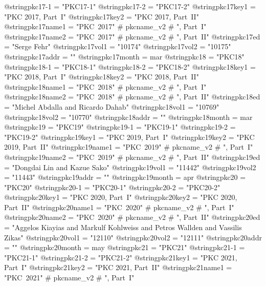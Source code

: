 @string{pkc17-1 =               "PKC17-1"}
@string{pkc17-2 =               "PKC17-2"}
@string{pkc17key1 =             "PKC 2017, Part~I"}
@string{pkc17key2 =             "PKC 2017, Part~II"}
@string{pkc17name1 =            "PKC~2017" # pkcname_v2 # ", Part~I"}
@string{pkc17name2 =            "PKC~2017" # pkcname_v2 # ", Part~II"}
@string{pkc17ed =               "Serge Fehr"}
@string{pkc17vol1 =             "10174"}
@string{pkc17vol2 =             "10175"}
@string{pkc17addr =             ""}
@string{pkc17month =            mar}
@string{pkc18 =                 "PKC18"}
@string{pkc18-1 =               "PKC18-1"}
@string{pkc18-2 =               "PKC18-2"}
@string{pkc18key1 =             "PKC 2018, Part~I"}
@string{pkc18key2 =             "PKC 2018, Part~II"}
@string{pkc18name1 =            "PKC~2018" # pkcname_v2 # ", Part~I"}
@string{pkc18name2 =            "PKC~2018" # pkcname_v2 # ", Part~II"}
@string{pkc18ed =               "Michel Abdalla and Ricardo Dahab"}
@string{pkc18vol1 =             "10769"}
@string{pkc18vol2 =             "10770"}
@string{pkc18addr =             ""}
@string{pkc18month =            mar}
@string{pkc19 =                 "PKC19"}
@string{pkc19-1 =               "PKC19-1"}
@string{pkc19-2 =               "PKC19-2"}
@string{pkc19key1 =             "PKC 2019, Part~I"}
@string{pkc19key2 =             "PKC 2019, Part~II"}
@string{pkc19name1 =            "PKC~2019" # pkcname_v2 # ", Part~I"}
@string{pkc19name2 =            "PKC~2019" # pkcname_v2 # ", Part~II"}
@string{pkc19ed =               "Dongdai Lin and Kazue Sako"}
@string{pkc19vol1 =             "11442"}
@string{pkc19vol2 =             "11443"}
@string{pkc19addr =             ""}
@string{pkc19month =            apr}
@string{pkc20 =                 "PKC20"}
@string{pkc20-1 =               "PKC20-1"}
@string{pkc20-2 =               "PKC20-2"}
@string{pkc20key1 =             "PKC 2020, Part~I"}
@string{pkc20key2 =             "PKC 2020, Part~II"}
@string{pkc20name1 =            "PKC~2020" # pkcname_v2 # ", Part~I"}
@string{pkc20name2 =            "PKC~2020" # pkcname_v2 # ", Part~II"}
@string{pkc20ed =               "Aggelos Kiayias and Markulf Kohlweiss and Petros Wallden and Vassilis Zikas"}
@string{pkc20vol1 =             "12110"}
@string{pkc20vol2 =             "12111"}
@string{pkc20addr =             ""}
@string{pkc20month =            may}
@string{pkc21 =                 "PKC21"}
@string{pkc21-1 =               "PKC21-1"}
@string{pkc21-2 =               "PKC21-2"}
@string{pkc21key1 =             "PKC 2021, Part~I"}
@string{pkc21key2 =             "PKC 2021, Part~II"}
@string{pkc21name1 =            "PKC~2021" # pkcname_v2 # ", Part~I"}
